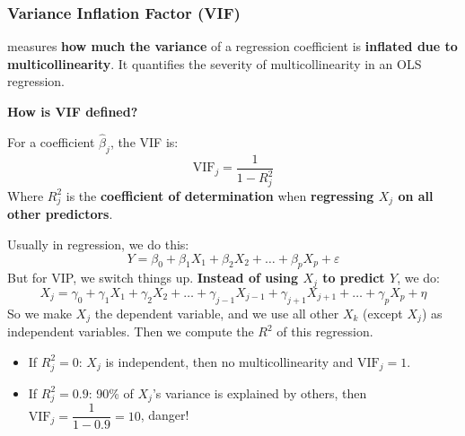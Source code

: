 \subsubsection{Variance Inflation Factor (VIF)}

 measures \textbf{how much the variance} of a regression coefficient is \textbf{inflated due to multicollinearity}. It quantifies the severity of multicollinearity in an OLS regression.

\highspace
\begin{flushleft}
    \textcolor{Green3}{ \textbf{How is VIF defined?}}
\end{flushleft}
For a coefficient $\hat{\beta}_{j}$, the VIF is:
\begin{equation}
    \text{VIF}_j = \dfrac{1}{1 - R_j^2}
\end{equation}
Where $R_j^2$ is the \textbf{coefficient of determination} when \textbf{regressing $X_j$ on all other predictors}.

\highspace
Usually in regression, we do this:
\begin{equation*}
    Y = \beta_0 + \beta_1 X_1 + \beta_2 X_2 + \dots + \beta_p X_p + \varepsilon
\end{equation*}
But for VIP, we switch things up. \textbf{Instead of using $X_j$ to predict $Y$}, we do:
\begin{equation*}
    X_j = \gamma_0 + \gamma_1 X_1 + \gamma_2 X_2 + \dots + \gamma_{j-1} X_{j-1} + \gamma_{j+1} X_{j+1} + \dots + \gamma_p X_p + \eta
\end{equation*}
So we make $X_j$ the dependent variable, and we use all other $X_k$ (except $X_j$) as independent variables. Then we compute the $R^2$ of this regression.
\begin{itemize}
    \item If $R_j^2 = 0$: $X_j$ is independent, then no multicollinearity and $\text{VIF}_j = 1$.
    \item If $R_j^2 = 0.9$: 90\% of $X_j$'s variance is explained by others, then $\text{VIF}_j = \dfrac{1}{1 - 0.9} = 10$, danger!
\end{itemize}

